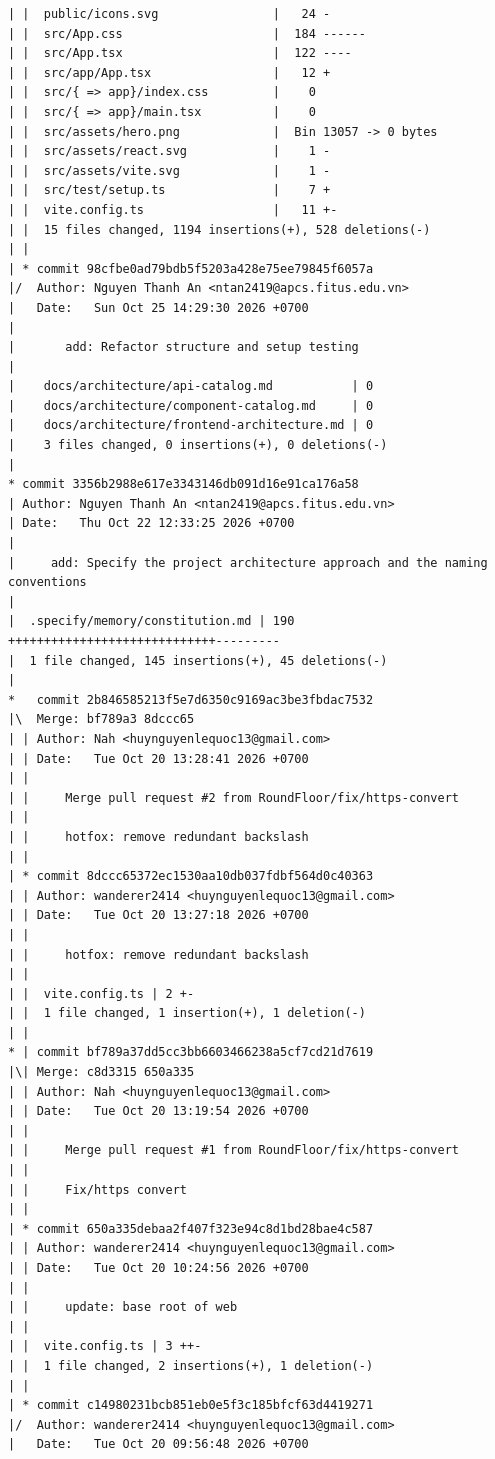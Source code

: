 \documentclass[12pt]{article}
\begin{document}
\begin{lstlisting}[numbers=none,breaklines=true]
| |  public/icons.svg                |   24 -
| |  src/App.css                     |  184 ------
| |  src/App.tsx                     |  122 ----
| |  src/app/App.tsx                 |   12 +
| |  src/{ => app}/index.css         |    0
| |  src/{ => app}/main.tsx          |    0
| |  src/assets/hero.png             |  Bin 13057 -> 0 bytes
| |  src/assets/react.svg            |    1 -
| |  src/assets/vite.svg             |    1 -
| |  src/test/setup.ts               |    7 +
| |  vite.config.ts                  |   11 +-
| |  15 files changed, 1194 insertions(+), 528 deletions(-)
| |
| * commit 98cfbe0ad79bdb5f5203a428e75ee79845f6057a
|/  Author: Nguyen Thanh An <ntan2419@apcs.fitus.edu.vn>
|   Date:   Sun Oct 25 14:29:30 2026 +0700
|
|       add: Refactor structure and setup testing
|
|    docs/architecture/api-catalog.md           | 0
|    docs/architecture/component-catalog.md     | 0
|    docs/architecture/frontend-architecture.md | 0
|    3 files changed, 0 insertions(+), 0 deletions(-)
|
* commit 3356b2988e617e3343146db091d16e91ca176a58
| Author: Nguyen Thanh An <ntan2419@apcs.fitus.edu.vn>
| Date:   Thu Oct 22 12:33:25 2026 +0700
|
|     add: Specify the project architecture approach and the naming conventions
|
|  .specify/memory/constitution.md | 190 +++++++++++++++++++++++++++++---------
|  1 file changed, 145 insertions(+), 45 deletions(-)
|
*   commit 2b846585213f5e7d6350c9169ac3be3fbdac7532
|\  Merge: bf789a3 8dccc65
| | Author: Nah <huynguyenlequoc13@gmail.com>
| | Date:   Tue Oct 20 13:28:41 2026 +0700
| |
| |     Merge pull request #2 from RoundFloor/fix/https-convert
| |
| |     hotfox: remove redundant backslash
| |
| * commit 8dccc65372ec1530aa10db037fdbf564d0c40363
| | Author: wanderer2414 <huynguyenlequoc13@gmail.com>
| | Date:   Tue Oct 20 13:27:18 2026 +0700
| |
| |     hotfox: remove redundant backslash
| |
| |  vite.config.ts | 2 +-
| |  1 file changed, 1 insertion(+), 1 deletion(-)
| |
* | commit bf789a37dd5cc3bb6603466238a5cf7cd21d7619
|\| Merge: c8d3315 650a335
| | Author: Nah <huynguyenlequoc13@gmail.com>
| | Date:   Tue Oct 20 13:19:54 2026 +0700
| |
| |     Merge pull request #1 from RoundFloor/fix/https-convert
| |
| |     Fix/https convert
| |
| * commit 650a335debaa2f407f323e94c8d1bd28bae4c587
| | Author: wanderer2414 <huynguyenlequoc13@gmail.com>
| | Date:   Tue Oct 20 10:24:56 2026 +0700
| |
| |     update: base root of web
| |
| |  vite.config.ts | 3 ++-
| |  1 file changed, 2 insertions(+), 1 deletion(-)
| |
| * commit c14980231bcb851eb0e5f3c185bfcf63d4419271
|/  Author: wanderer2414 <huynguyenlequoc13@gmail.com>
|   Date:   Tue Oct 20 09:56:48 2026 +0700

\end{lstlisting}
\end{document}
